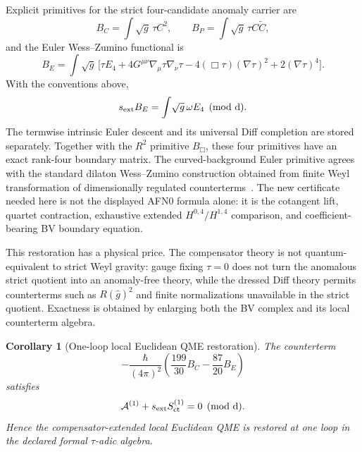 \documentclass[11pt]{article}
\newtheorem{corollary}[theorem]{Corollary}
\theoremstyle{definition}
\theoremstyle{remark}
\newcommand{\cA}{\mathcal A}
\newcommand{\dd}{\mathrm d}
\begin{document}
Explicit primitives for the strict four-candidate anomaly carrier are
\[
 B_C=\int\sqrt g\,\tau C^2,
 \qquad
 B_P=\int\sqrt g\,\tau C\widetilde C,
\]
and the Euler Wess--Zumino functional is
\[
 B_E=\int\!\sqrt g\,\bigl[
 \tau E_4+4G^{\mu\nu}\nabla_\mu\tau\nabla_\nu\tau
 -4(\Box\tau)(\nabla\tau)^2+2(\nabla\tau)^4\bigr].
\]
With the conventions above,
\[
 s_{\rm ext}B_E=\int\!\sqrt g\,\omega E_4\pmod{\dd}.
\]
The termwise intrinsic Euler descent and its universal Diff completion are
stored separately.  Together with the $R^2$ primitive $B_{\Box}$, these four
primitives have an exact rank-four boundary matrix.
The curved-background Euler primitive agrees with the standard dilaton
Wess--Zumino construction obtained from finite Weyl transformation of
dimensionally regulated counterterms~\cite{BaumeKerenZur}.  The new
certificate needed here is not the displayed AFN0 formula alone: it is the
cotangent lift, quartet contraction, exhaustive extended $H^{0,4}/H^{1,4}$
comparison, and coefficient-bearing BV boundary equation.

This restoration has a physical price.  The compensator theory is not
quantum-equivalent to strict Weyl gravity: gauge fixing $\tau=0$ does not turn
the anomalous strict quotient into an anomaly-free theory, while the dressed
Diff theory permits counterterms such as $R(\widehat g)^2$ and finite
normalizations unavailable in the strict quotient.  Exactness is obtained by
enlarging both the BV complex and its local counterterm algebra.

\begin{corollary}[One-loop local Euclidean QME restoration]
The counterterm
\[
 -\frac{\hbar}{(4\pi)^2}
 \left(\frac{199}{30}B_C-\frac{87}{20}B_E\right)
\]
satisfies
\[
 \cA^{(1)}+s_{\rm ext}S_{\rm ct}^{(1)}=0\pmod{\dd}.
\]
Hence the compensator-extended local Euclidean QME is restored at one loop in
the declared formal $\tau$-adic algebra.
\end{corollary}
\end{document}
